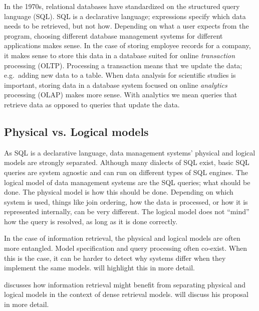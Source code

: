 In the 1970s, relational databases have standardized on the structured query language (SQL).  
SQL is a declarative language; expressions specify which data needs to be retrieved, but not how. Depending on what a user expects from the program, choosing different database management systems for different applications makes sense. In the case of storing employee records for a company, it makes sense to store this data in a database suited for online \emph{transaction} processing (OLTP). Processing a transaction means that we update the data; e.g.\ adding new data to a table. When data analysis for scientific studies is important, storing data in a database system focused on online \emph{analytics} processing (OLAP) makes more sense. With analytics we mean queries that retrieve data as opposed to queries that update the data.  

\subsection{Physical vs. Logical models}
As SQL is a declarative language, data management systems' physical and logical models are strongly separated. Although many dialects of SQL exist, basic SQL queries are system agnostic and can run on different types of SQL engines. The logical model of data management systems are the SQL queries; what should be done. The physical model is how this should be done. Depending on which system is used, things like join ordering, how the data is processed, or how it is represented internally, can be very different. The logical model does not ``mind'' how the query is resolved, as long as it is done correctly. 

In the case of information retrieval, the physical and logical models are often more entangled. Model specification and query processing often co-exist. When this is the case, it can be harder to detect why systems differ when they implement the same models.  will highlight this in more detail. 

\citet{seperation-logical-physical} discusses how information retrieval might benefit from separating physical and logical models in the context of dense retrieval models.  will discuss his proposal in more detail.

